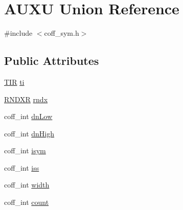 \hypertarget{unionAUXU}{
\section{AUXU Union Reference}
\label{unionAUXU}
}


{\ttfamily \#include $<$coff\_\-sym.h$>$}

\subsection*{Public Attributes}
\begin{DoxyCompactItemize}
\item 
\hyperlink{structTIR}{TIR} \hyperlink{unionAUXU_aeed8d219ef07fd07c30c04690e566191}{ti}
\item 
\hyperlink{structRNDXR}{RNDXR} \hyperlink{unionAUXU_a94430b9767d7cdd6319772ede408e526}{rndx}
\item 
coff\_\-int \hyperlink{unionAUXU_a4ad1de46371c0a052485d93d44b9dd8c}{dnLow}
\item 
coff\_\-int \hyperlink{unionAUXU_a7ebafc817c7ce05883534f32ccc89b28}{dnHigh}
\item 
coff\_\-int \hyperlink{unionAUXU_a83e9abf908e181a2af122dfa0a880341}{isym}
\item 
coff\_\-int \hyperlink{unionAUXU_abf7ab39f3d114bfe343d6187238e97a4}{iss}
\item 
coff\_\-int \hyperlink{unionAUXU_a9c1651961315a871bd30484de8df7818}{width}
\item 
coff\_\-int \hyperlink{unionAUXU_a65a4ab944edcf38e8652f909331762ba}{count}
\end{DoxyCompactItemize}


